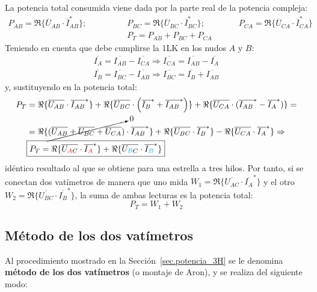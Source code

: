	La potencia total consumida viene dada por la parte real de la potencia compleja: 
	\begin{align*}
	    P_{AB}=\Re\{\overline{U}_{AB} \cdot \overline{I}_{AB}^*\};\qquad \qquad
	    &P_{BC}=\Re\{\overline{U}_{BC} \cdot \overline{I}_{BC}^*\};\qquad \qquad
	    P_{CA}=\Re\{\overline{U}_{CA} \cdot \overline{I}_{CA}^*\}\\
	    &P_T=P_{AB}+P_{BC}+P_{CA}
	\end{align*}
	Teniendo en cuenta que debe cumplirse la 1LK en los nudos $A$ y $B$:
	\begin{align*}
	    \overline{I_A}=\overline{I_{AB}}-\overline{I_{CA}}\Rightarrow \overline{I_{CA}}=\overline{I_{AB}}-\overline{I_A}\\
	    \overline{I_B}=\overline{I_{BC}}-\overline{I_{AB}}\Rightarrow \overline{I_{BC}}=\overline{I_{B}}+\overline{I_{AB}}
	\end{align*}
	y, sustituyendo en la potencia total:
		\begin{align}
	    P_T&= \Re\{\overline{U_{AB}}\cdot \overline{I_{AB}}^*\} + \Re\{\overline{U_{BC}}\cdot\left(\overline{I_B}^*+\overline{I_{AB}}^* \right)\}  + \Re\{\overline{U_{CA}} \cdot (\overline{I_{AB}}^*-\overline{I_A}^*)\}=\nonumber \\
                  &= \Re\{\cancelto{0}{(\overline{U_{AB}}+\overline{U_{BC}}+\overline{U_{CA}})}\cdot \overline{I_{AB}}^*\}+\Re\{\overline{U_{BC}} \cdot \overline{I_B}^*\} - \Re\{\overline{U_{CA}} \cdot \overline{I_A}^*\}\Rightarrow \nonumber \\
                  &\boxed{P_T=\Re\{\overline{U_{\textcolor{red}{A}C}} \cdot \overline{I_{\textcolor{red}{A}}}^*\} + \Re\{\overline{U_{\textcolor{cyan}{B}C}} \cdot \overline{I_{\textcolor{cyan}{B}}}^*\}}
	\end{align}
	idéntico resultado al que se obtiene para una estrella a tres hilos. Por tanto, si se conectan dos vatímetros de manera que uno mida $W_1=\Re\{\overline{U_{AC}} \cdot \overline{I_A}^*\}$ y el otro $W_2=\Re\{\overline{U_{BC}} \cdot \overline{I_B}^*\}$, la suma de ambas lecturas es la potencia total: 
	\begin{equation*}
	    P_T=W_1+W_2
	\end{equation*}
	
	\subsection{Método de los dos vatímetros}\label{sec.dos_vat}
	
	Al procedimiento mostrado en la Sección~\ref{sec.potencia_3H} se le denomina \textbf{método de los dos vatímetros} (o montaje de Aron), y se realiza del siguiente modo: 
	
